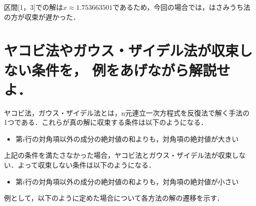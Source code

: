 \documentclass[dvipdfmx,titlepage]{jsarticle}
\begin{document}
区間[1，3]での解は$x\approx 1.753663501$であるため，今回の場合では，はさみうち法の方が収束が遅かった．

\section{ヤコビ法やガウス・ザイデル法が収束しない条件を，
例をあげながら解説せよ．}

ヤコビ法，ガウス・ザイデル法とは，n元連立一次方程式を反復法で解く手法の1つである．これらが真の解に収束する条件は以下のようになる．
\begin{itemize}
 \item 第$i$行の対角項以外の成分の絶対値の和よりも，対角項の絶対値が大きい
\end{itemize}
上記の条件を満たさなかった場合，ヤコビ法とガウス・ザイデル法が収束しない．よって収束しない条件は以下のようになる．
\begin{itemize}
 \item 第$i$行の対角項以外の成分の絶対値の和よりも，対角項の絶対値が小さい
\end{itemize}

例として，以下のように定めた場合について各方法の解の遷移を示す．
\end{document}
